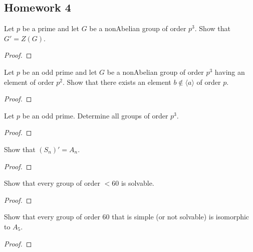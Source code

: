 \subsection{Homework 4}
\begin{problem}
Let $p$ be a prime and let $G$ be a nonAbelian group of order $p^3$. Show
that $G'=Z(G)$.
\end{problem}
\begin{proof}
\end{proof}

\begin{problem}
Let $p$ be an odd prime and let $G$ be a nonAbelian group of order $p^3$
having an element of order $p^2$. Show that there exists an element
$b\notin\langle a \rangle$ of order $p$.
\end{problem}
\begin{proof}
\end{proof}

\begin{problem}
Let $p$ be an odd prime. Determine all groups of order $p^3$.
\end{problem}
\begin{proof}
\end{proof}

\begin{problem}
Show that $(S_n)'=A_n$.
\end{problem}
\begin{proof}
\end{proof}

\begin{problem}
Show that every group of order $<60$ is solvable.
\end{problem}
\begin{proof}
\end{proof}

\begin{problem}
Show that every group of order $60$ that is simple (or not solvable) is
isomorphic to $A_5$.
\end{problem}
\begin{proof}
\end{proof}

